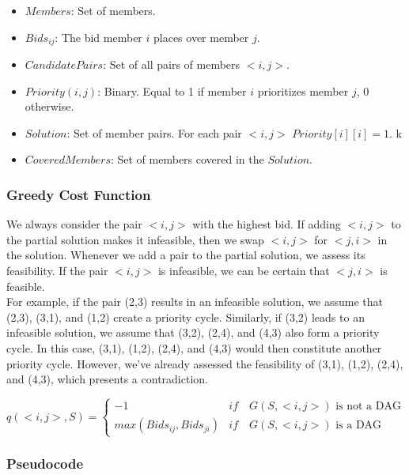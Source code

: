 \documentclass{article}
\begin{document}
\begin{itemize}
    \item $Members$: Set of members.
    \item $Bids_{ij}$: The bid member $i$ places over member $j$.
    \item $CandidatePairs$: Set of all pairs of members $<i,j>$.
    \item $Priority(i,j)$: Binary. Equal to 1 if member $i$ prioritizes member $j$, 0 otherwise.
    \item $Solution$: Set of member pairs. For each pair $<i,j>$ $Priority[i][i] = 1$.
k    \item $CoveredMembers$: Set of members covered in the $Solution$.
    
\end{itemize}

\subsubsection{Greedy Cost Function} \label{greedy_function}

We always consider the pair $<i,j>$ with the highest bid. If adding $<i,j>$ to the partial solution makes it infeasible, then we swap $<i,j>$ for $<j,i>$ in the solution.
Whenever we add a pair to the partial solution, we assess its feasibility. If the pair $<i,j>$ is infeasible, we can be certain that $<j,i>$ is feasible.\\
For example, if the pair (2,3) results in an infeasible solution, we assume that (2,3), (3,1), and (1,2) create a priority cycle. Similarly, if (3,2) leads to an infeasible solution, we assume that (3,2), (2,4), and (4,3) also form a priority cycle. In this case, (3,1), (1,2), (2,4), and (4,3) would then constitute another priority cycle. However, we've already assessed the feasibility of (3,1), (1,2), (2,4), and (4,3), which presents a contradiction.

\begin{displaymath}
    q(<i,j>, S) = \begin{cases}
    -1 & if \quad G(S, <i,j>) \textrm{ is not a DAG}\\
    max(Bids_{ij}, Bids_{ji}) & if \quad G(S, <i,j>) \textrm{ is a DAG}
    \end{cases}
\end{displaymath}

\subsubsection{Pseudocode}
\end{document}
